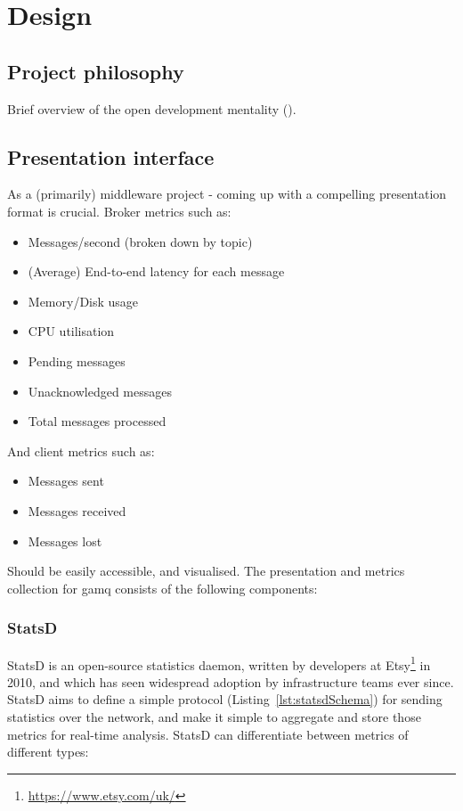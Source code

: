\chapter{Design}
\label{chap:Design}

\section{Project philosophy}
\label{sec:Project philosophy}

Brief overview of the open development mentality ().

\section{Presentation interface}
\label{sec:presentation}

As a (primarily) middleware project - coming up with a compelling presentation
format is crucial. Broker metrics such as:

\begin{itemize}
  \item Messages/second (broken down by topic)
  \item (Average) End-to-end latency for each message
  \item Memory/Disk usage
  \item CPU utilisation
  \item Pending messages
  \item Unacknowledged messages
  \item Total messages processed
\end{itemize}

And client metrics such as:

\begin{itemize}
  \item Messages sent
  \item Messages received
  \item Messages lost
\end{itemize}

Should be easily accessible, and visualised. The presentation and metrics
collection for gamq consists of the following components:

\subsection{StatsD}
\label{sub:StatsD}

StatsD is an open-source statistics daemon, written by developers at
Etsy\footnote{\url{https://www.etsy.com/uk/}} in 2010\cite{statsd}, and which
has seen widespread adoption by infrastructure teams ever since. StatsD aims to
define a simple protocol (Listing~\ref{lst:statsdSchema}) for sending statistics
over the network, and make it simple to aggregate and store those metrics for
real-time analysis. StatsD can differentiate between metrics of different types:

